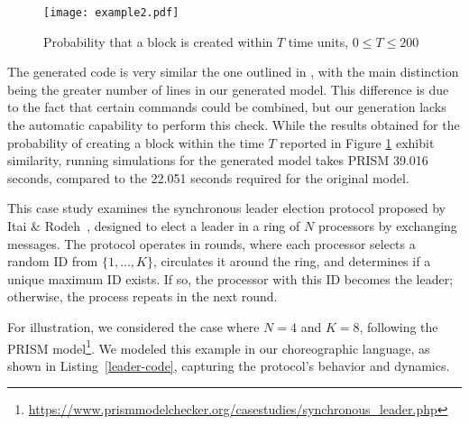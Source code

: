 \begin{figure}[h]
	\centering
	\texttt{[image: example2.pdf]}	
	\caption{Probability that a block is created within $T$ time units, $0\leq T\leq 200$}
	\label{ex5-res}
	\end{figure}
        The generated code is very similar the one outlined in
        \cite{DBLP:journals/distribledger/GallettaLMV23}, with the
        main distinction being the greater number of lines in our
        generated model.  This difference is due to the fact that
        certain commands could be combined, but our generation lacks
        the automatic capability to perform this check. While the
        results obtained for the probability of creating a block within the time $T$
        reported in Figure \ref{ex5-res} exhibit similarity, running
        simulations for the generated model takes PRISM 39.016
        seconds, compared to the 22.051 seconds required for the
        original model.



This case study examines the synchronous leader election protocol proposed by Itai $\&$ Rodeh~\cite{IR90}, designed to elect a leader in a ring of $N$ processors by exchanging messages. The protocol operates in rounds, where each processor selects a random ID from $\{1, \ldots, K\}$, circulates it around the ring, and determines if a unique maximum ID exists. If so, the processor with this ID becomes the leader; otherwise, the process repeats in the next round.

For illustration, we considered the case where $ N=4 $ and $ K=8 $, following the PRISM model\footnote{\url{https://www.prismmodelchecker.org/casestudies/synchronous_leader.php}}. We modeled this example in our choreographic language, as shown in Listing~\ref{leader-code}, capturing the protocol's behavior and dynamics.

